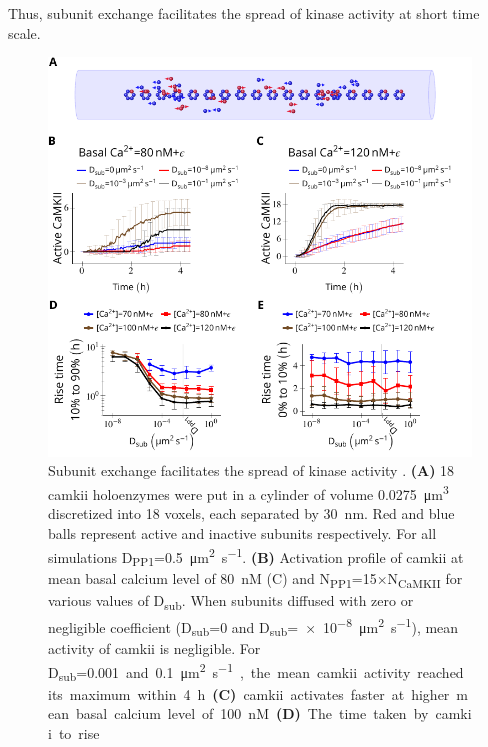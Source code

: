 \documentclass[9pt,lineno]{elife}
\newcommand\SUB[2]{#1\textsubscript{#2}}
\begin{document}
Thus, subunit exchange facilitates the spread of kinase activity at short time
scale.

\begin{figure}
    \includegraphics[width=0.95\linewidth]{./PaperFigures/elifeFigure4/figure_camkii_activation_130mm.pdf}
    \caption{Subunit exchange facilitates the spread of kinase activity
        \citep{stratton_activation-triggered_2014}. \textbf{(A)} 18 \gls{camkii} holoenzymes were put in
        a cylinder of volume \SI{0.0275}{\cubic\micro\meter} discretized into 18
        voxels, each separated by \SI{30}{\nano\meter}. Red and blue balls
        represent active and inactive subunits respectively.  For all
        simulations \SUB{D}{PP1}=\SI{0.5}{\micro\meter\squared\per\second}.
        \textbf{(B)} Activation profile of \gls{camkii} at mean basal calcium
        level of \SI{80}{\nano M} (C) and
        \SUB{N}{PP1}=15$\times$\SUB{N}{CaMKII} for various values of
        \SUB{D}{sub}. When subunits diffused with zero or negligible coefficient
        (\SUB{D}{sub}=0 and
        \SUB{D}{sub}=\SI{e-8}{\micro\meter\squared\per\second}), mean activity
        of \gls{camkii} is negligible. For \SUB{D}{sub}=\SI{0.001} and
        \SI{0.1}{\micro\meter\squared\per\second}, the mean \gls{camkii}
        activity reached its maximum within \SI{4}{\hour}.  \textbf{(C)}
        \gls{camkii} activates faster at higher mean basal calcium level of
        \SI{100}{\nano M}. \textbf{(D)} The time taken by \gls{camkii} to rise
}
\end{figure}
\end{document}
